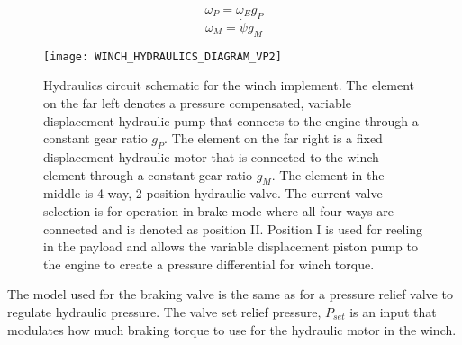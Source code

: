 \begin{equation}
    \omega_P = \omega_E g_P
\end{equation}
\begin{equation}\label{eq:VP2_end}
    \omega_M = \dot\psi g_M
\end{equation}
\begin{figure}[tb]
    \centering
    \texttt{[image: WINCH\_HYDRAULICS\_DIAGRAM\_VP2]}
    \caption{Hydraulics circuit schematic for the winch implement. The element on the far left denotes a pressure compensated, variable displacement hydraulic pump that connects to the engine through a constant gear ratio $g_P$. The element on the far right is a fixed displacement hydraulic motor that is connected to the winch element through a constant gear ratio $g_M$. The element in the middle is 4 way, 2 position hydraulic valve. The current valve selection is for operation in brake mode where all four ways are connected and is denoted as position II. Position I is used for reeling in the payload and allows the variable displacement piston pump to the engine to create a pressure differential for winch torque.}
    \label{fig:Winch_Hydraulics_Diagram}
\end{figure}
The model used for the braking valve is the same as for a pressure relief valve to regulate hydraulic pressure. The valve set relief pressure, $P_{set}$ is an input that modulates how much braking torque to use for the hydraulic motor in the winch.

